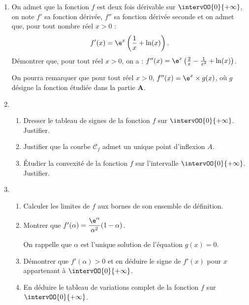 \begin{enumerate}
	\item On admet que la fonction $f$ est deux fois dérivable sur $\intervOO{0}{+\infty}$, on note $f'$ sa fonction dérivée, $f''$ sa fonction dérivée seconde et on admet que, pour tout nombre réel $x > 0$ : \[ f'(x)=\e^x \left(\frac1x+\ln(x)\right). \]
	Démontrer que, pour tout réel $x > 0$, on a : $f''(x) = \e^x \left(\frac2x-\frac{1}{x^2}+\ln(x)\right)$.
	
	\smallskip
	
	On pourra remarquer que pour tout réel $x > 0$, $f''(x) = \e^x \times g(x)$, où $g$ désigne la fonction étudiée dans la partie \textbf{A}.
	\item 
	\begin{enumerate}
		\item Dresser le tableau de signes de la fonction $f$ sur $\intervOO{0}{+\infty}$. Justifier.
		\item Justifier que la courbe $\mathcal{C}_f$ admet un unique point d’inflexion $A$.
		\item Étudier la convexité de la fonction $f$ sur l’intervalle $\intervOO{0}{+\infty}$. Justifier.
	\end{enumerate}
	\item 
	\begin{enumerate}
		\item Calculer les limites de $f$ aux bornes de son ensemble de définition.
		\item Montrer que $f'(\alpha) = \dfrac{\e^{\alpha}}{\alpha^2}(1-\alpha)$.
		
		On rappelle que $\alpha$ est l’unique solution de l’équation $g(x) = 0$.
		\item Démontrer que $f'(\alpha)>0$ et en déduire le signe de $f'(x)$ pour $x$ appartenant à $\intervOO{0}{+\infty}$.
		\item En déduire le tableau de variations complet de la fonction $f$ sur $\intervOO{0}{+\infty}$.
	\end{enumerate}
\end{enumerate}